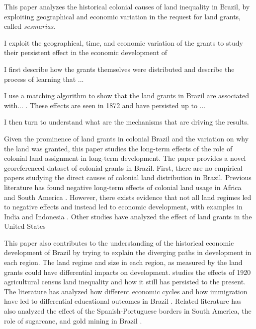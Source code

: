 \documentclass{article}
\begin{document}
This paper analyzes the historical colonial causes of land inequality in Brazil, by exploiting geographical and economic variation in the request for land grants, called \textit{sesmarias}.

I exploit the geographical, time, and economic variation of the grants to study their persistent effect in the economic development of

I first describe how the grants themselves were distributed and describe the process of learning that ...

I use a matching algorithm to show that the land grants in Brazil are associated with... . These effects are seen in 1872 and have persisted up to ... 

I then turn to understand what are the mechanisms that are driving the results. 

Given the prominence of land grants in colonial Brazil and the variation on why the land was granted, this paper studies the long-term effects of the role of colonial land assignment in long-term development.  
The paper provides a novel georeferenced dataset of colonial grants in Brazil. 
First, there are no empirical papers studying the direct causes of colonial land distribution in Brazil. 
Previous literature has found negative long-term effects of colonial land usage in Africa and South America \parencites{Dell2010-qt}{Lowes2021-ww}. 
However, there exists evidence that not all land regimes led to negative effects and instead led to economic development, with examples in India and Indonesia \parencites{Banerjee2005-ki}{Dell2019-np}{Ratnoo2023-vw}.  
Other studies have analyzed the effect of land grants in the United States \parencites{Akee2014-uw}{Allen2019-kh}{Smith2023-ip}

This paper also contributes to the understanding of the historical economic development of Brazil by trying to explain the diverging paths in development in each region. 
The land regime and size in each region, as measured by the land grants could have differential impacts on development.
\textcite{Wigton-Jones2020-ex} studies the effects of 1920 agricultural census land inequality and how it still has persisted to the present.
The literature has analyzed how different economic cycles and how immigration have led to differential educational outcomes in Brazil \parencites{Musacchio2014-pq}{Rocha2017-yq}.
Related literature has also analyzed the effect of the Spanish-Portuguese borders in South America, the role of sugarcane, and gold mining in Brazil \parencites{Laudares2022-vy}{Naritomi2012-or}.
\end{document}
